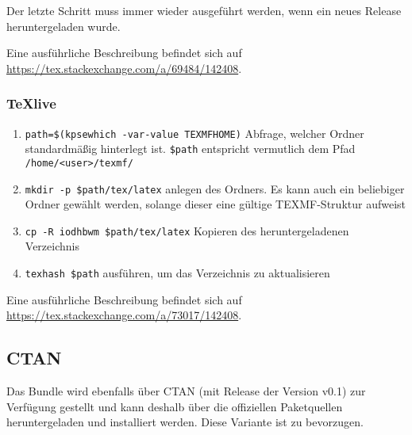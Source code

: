 \documentclass[babel=ngerman,highlight=false]{skdoc}
\begin{document}
                Der letzte Schritt muss immer wieder ausgeführt werden, wenn ein neues Release heruntergeladen wurde.
                
                Eine ausführliche Beschreibung befindet sich auf \url{https://tex.stackexchange.com/a/69484/142408}.
            
            \subsubsection{TeXlive}
                
                \begin{enumerate}
                    \item \verb|path=$(kpsewhich -var-value TEXMFHOME)| Abfrage, welcher Ordner standardmäßig hinterlegt ist. \verb|$path| entspricht vermutlich dem Pfad\\ \verb|/home/<user>/texmf/|
                    \item \verb|mkdir -p $path/tex/latex| anlegen des Ordners. Es kann auch ein beliebiger Ordner gewählt werden, solange dieser eine gültige TEXMF-Struktur aufweist
                    \item \verb|cp -R iodhbwm $path/tex/latex| Kopieren des heruntergeladenen Verzeichnis
                    \item \verb|texhash $path| ausführen, um das Verzeichnis zu aktualisieren
                \end{enumerate}
            
                Eine ausführliche Beschreibung befindet sich auf \url{https://tex.stackexchange.com/a/73017/142408}.
                
        \subsection{CTAN}
            Das Bundle wird ebenfalls über CTAN (mit Release der Version v0.1) zur Verfügung gestellt und kann deshalb über die offiziellen Paketquellen heruntergeladen und installiert werden. Diese Variante ist zu bevorzugen.

    \PrintIndex
\end{document}
